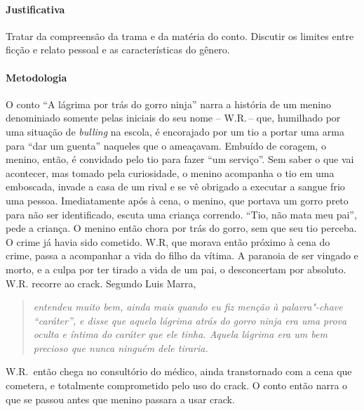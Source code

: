 \documentclass[11pt]{extarticle}
\begin{document}
\paragraph{Justificativa} Tratar da compreensão da trama e da matéria do conto. 
Discutir os limites entre ficção e relato pessoal e as características do 
gênero. 

\paragraph{Metodologia}
 O conto ``A lágrima por trás do gorro ninja'' narra a história de um menino denominiado 
 somente pelas iniciais do seu nome -- W.R.\,-- que, 
 humilhado por uma situação de \textit{bulling} na escola, é encorajado por um tio
 a portar uma arma para ``dar um guenta'' naqueles que o ameaçavam. Embuído de coragem, 
 o menino, então, é convidado pelo tio para fazer ``um serviço''. Sem saber o que vai 
 acontecer, mas tomado pela curiosidade, o menino acompanha o tio em uma emboscada, 
 invade a casa de um rival e se vê obrigado a executar a sangue frio uma pessoa. 
 Imediatamente após à cena, o menino, que portava um gorro preto para não ser 
 identificado, escuta uma criança correndo. ``Tio, não mata meu pai'', pede 
 a criança. O menino então chora por trás do gorro, sem que seu tio perceba. 
 O crime já havia sido cometido. W.R, que morava então próximo 
 à cena do crime, passa a acompanhar a vida do filho da vítima. A paranoia de ser vingado
 e morto, e a culpa por ter tirado a vida de um pai, o desconcertam por absoluto. 
 W.R. recorre ao crack. 
 Segundo Luis Marra, 
\begin{quote}
\textit{ entendeu muito bem, ainda mais quando eu fiz menção à palavra"-chave
``caráter'', e disse que aquela lágrima atrás do gorro ninja era uma
prova oculta e íntima do caráter que ele tinha. Aquela lágrima era um
bem precioso que nunca ninguém dele tiraria.}
\end{quote}

 W.R.~então chega no consultório do médico, 
 ainda transtornado com a cena que cometera, e totalmente comprometido pelo 
 uso do crack. O conto então narra o que se passou antes que menino passara
 a usar crack. 
\end{document}
